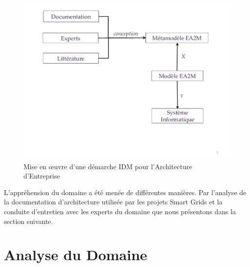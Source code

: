     \begin{figure}[!ht]

         \begin{center}

        \includegraphics[trim=0cm 4cm 0cm 0cm, width=1\textwidth]{figures/4_demarche/demarche_idm.pdf}

         \end{center}

         \caption{Mise en œuvre d'une démarche IDM pour l'Architecture
         d'Entreprise}

         \label{fig:demarche_idem}

    \end{figure}

    L'appréhension du domaine a été menée de différentes manières. Par l'analyse
    de la documentation d'architecture utilisée par les projets Smart
    Grids et la conduite d'entretien avec les experts du domaine que
    nous présentons dans la  section suivante.





\section{Analyse du Domaine}

